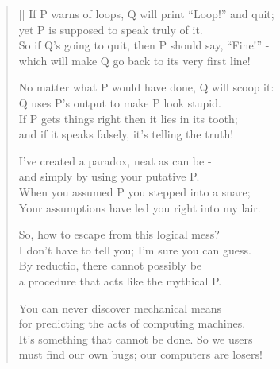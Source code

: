 \begin{verse}[\versewidth]
  If P warns of loops, Q will print “Loop!” and quit;\\
  yet P is supposed to speak truly of it.\\
  So if Q's going to quit, then P should say, “Fine!” -\\
  which will make Q go back to its very first line!

  No matter what P would have done, Q will scoop it:\\
  Q uses P's output to make P look stupid.\\
  If P gets things right then it lies in its tooth;\\
  and if it speaks falsely, it's telling the truth!

  I've created a paradox, neat as can be -\\
  and simply by using your putative P.\\
  When you assumed P you stepped into a snare;\\
  Your assumptions have led you right into my lair.

  So, how to escape from this logical mess?\\
  I don't have to tell you; I'm sure you can guess.\\
  By reductio, there cannot possibly be\\
  a procedure that acts like the mythical P.

  You can never discover mechanical means\\
  for predicting the acts of computing machines.\\
  It's something that cannot be done. So we users\\
  must find our own bugs; our computers are losers!
\end{verse}
